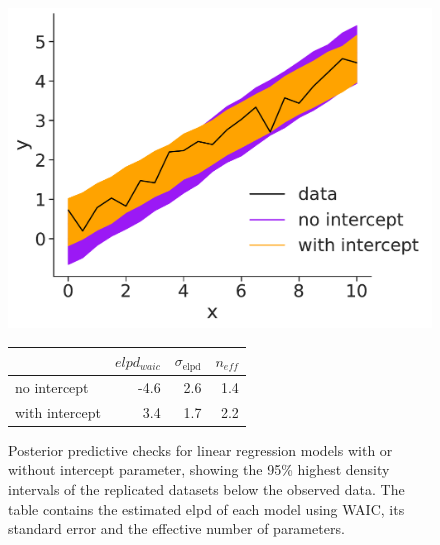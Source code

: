 \begin{figure}[t]
  \begin{minipage}{0.5\linewidth}
    \includegraphics[width=\linewidth]{figures/ch2/linear/ppc_compare_0.pdf}
  \end{minipage} 
  \begin{minipage}{0.4\linewidth}
   \begin{tabular}{lrrr}
\toprule
 &  $elpd_{waic}$ & $\sigma_{\text{elpd}}$ & $n_{eff}$ \\
\midrule
no intercept   &      -4.6 & 2.6 &    1.4 \\
with intercept &       3.4 & 1.7 &    2.2 \\
\bottomrule
\end{tabular}
  \end{minipage}
\caption{Posterior predictive checks for linear regression models with or without intercept parameter, showing the 95\%
  highest density intervals of the replicated datasets below the observed data. The table contains the estimated elpd of each model using WAIC, its standard error and the effective number of
parameters.}
\label{waic}
\end{figure}

